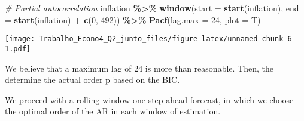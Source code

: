 \documentclass[
]{article}
\newenvironment{Shaded}{\begin{snugshade}}{\end{snugshade}}
\newcommand{\AttributeTok}[1]{\textcolor[rgb]{0.13,0.29,0.53}{#1}}
\newcommand{\CommentTok}[1]{\textcolor[rgb]{0.56,0.35,0.01}{\textit{#1}}}
\newcommand{\ControlFlowTok}[1]{\textcolor[rgb]{0.13,0.29,0.53}{\textbf{#1}}}
\newcommand{\DecValTok}[1]{\textcolor[rgb]{0.00,0.00,0.81}{#1}}
\newcommand{\FunctionTok}[1]{\textcolor[rgb]{0.13,0.29,0.53}{\textbf{#1}}}
\newcommand{\NormalTok}[1]{#1}
\newcommand{\OtherTok}[1]{\textcolor[rgb]{0.56,0.35,0.01}{#1}}
\newcommand{\SpecialCharTok}[1]{\textcolor[rgb]{0.81,0.36,0.00}{\textbf{#1}}}
\begin{document}
\begin{Shaded}
\begin{Highlighting}[]
\CommentTok{\# Partial autocorrelation}
\NormalTok{inflation }\SpecialCharTok{\%\textgreater{}\%}
    \FunctionTok{window}\NormalTok{(}\AttributeTok{start =} \FunctionTok{start}\NormalTok{(inflation), }\AttributeTok{end =} \FunctionTok{start}\NormalTok{(inflation) }\SpecialCharTok{+}
        \FunctionTok{c}\NormalTok{(}\DecValTok{0}\NormalTok{, }\DecValTok{492}\NormalTok{)) }\SpecialCharTok{\%\textgreater{}\%}
    \FunctionTok{Pacf}\NormalTok{(}\AttributeTok{lag.max =} \DecValTok{24}\NormalTok{, }\AttributeTok{plot =}\NormalTok{ T)}
\end{Highlighting}
\end{Shaded}

\texttt{[image: Trabalho\_Econo4\_Q2\_junto\_files/figure-latex/unnamed-chunk-6-1.pdf]}

We believe that a maximum lag of 24 is more than reasonable. Then, the
determine the actual order p based on the BIC.

\begin{Shaded}
\end{Shaded}

We proceed with a rolling window one-step-ahead forecast, in which we
choose the optimal order of the AR in each window of estimation.
\end{document}
